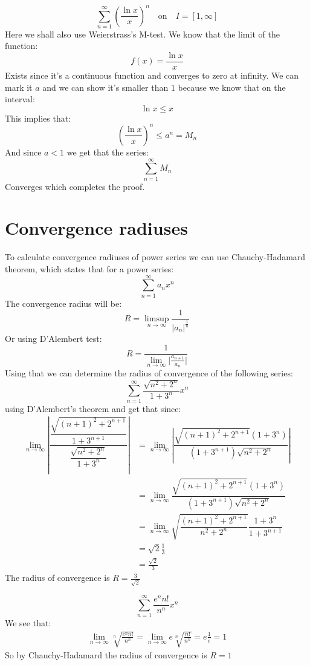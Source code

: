 \documentclass[11pt,a4paper]{article}
\begin{document}
	\newpage
	
	\[
	\sum_{n=1}^{\infty}{
	\left(\frac{\ln x}{x}\right)^n}\quad\text{on}\quad I=[1,\infty]
	\]
	Here we shall also use Weierstrass's M-test. We know that
	the limit of the function:
	\[
		f(x) = \frac{\ln x}{x}
	\]
	Exists since it's a continuous function and converges to zero at
	infinity. We can mark it $a$ and we can show it's smaller than $1$
	because we know that on the interval:
	\[
		\ln x \le x
	\]
	This implies that:
	\[
		\left(\frac{\ln x}{x}\right)^n \le a^n = M_n
	\]
	And since $a < 1$ we get that the series:
	\[
		\sum_{n=1}^{\infty}{M_n}
	\]
	Converges which completes the proof.
	
	\newpage
	
	\section{Convergence radiuses}
	
	To calculate convergence radiuses of power series we can use 
	Chauchy-Hadamard theorem, which states that for a power series:
	\[
		\sum_{n=1}^{\infty}{a_n x^n}
	\]
	The convergence radius will be:
	\[
		R = \limsup_{n\to\infty}{\frac{1}{\vert a_n \vert^{\frac 1n}}}
	\]
	Or using D'Alembert test:
	\[
		R = \frac{1}{\lim_{n\to\infty}{\vert\frac{a_{n+1}}{a_{n}}\vert}}
	\]
	Using that we can determine the radius of convergence of the following
	series:
	\[
		\sum_{n=1}^{\infty}{\frac{\sqrt{n^2+2^n}}{1+3^n}x^n}
	\]
	using D'Alembert's theorem and get that since:
	\begin{align*}
		\lim_{n\to\infty}
		{
			\left\vert \dfrac
			{\dfrac{\sqrt{(n+1)^2+2^{n+1}}}{1+3^{n+1}}}
			{\dfrac{\sqrt{n^2+2^n}}{1+3^n}} \right\vert
		} &= 
		\lim_{n\to\infty}
		{
			\left\vert \dfrac
			{\sqrt{(n+1)^2+2^{n+1}}(1+3^n)}{(1+3^{n+1})\sqrt{n^2+2^n}} 
			\right\vert
		} \\ &= 
		\lim_{n\to\infty}
		{
			\dfrac
			{\sqrt{(n+1)^2+2^{n+1}}(1+3^n)}{(1+3^{n+1})\sqrt{n^2+2^n}}
		} \\ &= 
		\lim_{n\to\infty}
		{
			\sqrt{\dfrac{(n+1)^2+2^{n+1}}{n^2+2^n}}
			\dfrac{1+3^n}{1+3^{n+1}}
		} \\ &= \sqrt{2} \frac{1}{3} 
		  \\ &= \frac{\sqrt{2}}{3}
	\end{align*}
	The radius of convergence is $R = \frac{3}{\sqrt{2}}$
	
	\newpage
	
	\[
		\sum_{n=1}^{\infty}{\frac{e^n n!}{n^n}x^n}
	\]
	We see that:
	\begin{align*}
		\lim_{n\to\infty}{\sqrt[n]{\frac{e^n n!}{n^n}}} = 
		\lim_{n\to\infty}{e \sqrt[n]{\frac{n!}{n^n}}} = e \frac{1}{e} = 1
	\end{align*}
	So by Chauchy-Hadamard the radius of convergence is $R = 1$
	
\end{document}
